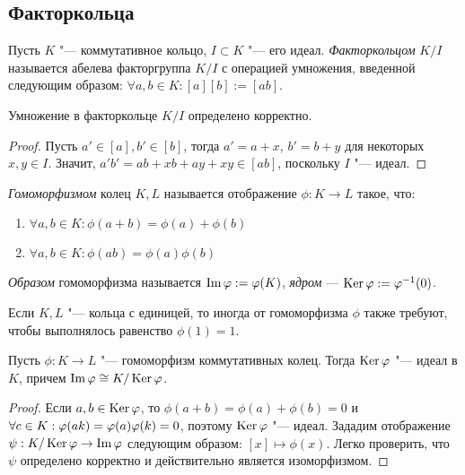 \subsection{Факторкольца}

\begin{definition}
	Пусть $K$ "--- коммутативное кольцо, $I \subset K$ "--- его идеал. \textit{Факторкольцом} $K / I$ называется абелева факторгруппа $K / I$ с операцией умножения, введенной следующим образом: $\forall a, b \in K: [a][b] := [ab]$.
\end{definition}

\begin{proposition}
	Умножение в факторкольце $K / I$ определено корректно.
\end{proposition}

\begin{proof}
	Пусть $a' \in [a], b' \in [b]$, тогда $a' = a + x$, $b' = b + y$ для некоторых $x, y \in I$. Значит, $a'b' = ab + xb + ay + xy \in [ab]$, поскольку $I$ "--- идеал.
\end{proof}

\begin{definition}
	\textit{Гомоморфизмом} колец $K, L$ называется отображение $\phi: K \to L$ такое, что:
	\begin{enumerate}
		\item $\forall a, b \in K: \phi(a + b) = \phi(a) + \phi(b)$
		\item $\forall a, b \in K: \phi(ab) = \phi(a)\phi(b)$
	\end{enumerate}

	\textit{Образом} гомоморфизма называется $\operatorname{Im}\varphi := \varphi(K)$, \textit{ядром} --- $\operatorname{Ker}\varphi := \varphi^{-1}(0)$.
\end{definition}

\begin{note}
	Если $K, L$ "--- кольца с единицей, то иногда от гомоморфизма $\phi$ также требуют, чтобы выполнялось равенство $\phi(1) = 1$.
\end{note}

\begin{theorem}
	Пусть $\phi : K \to L$ "--- гомоморфизм коммутативных колец. Тогда $\operatorname{Ker}\varphi$ "--- идеал в $K$, причем $\operatorname{Im}\varphi \cong K / \operatorname{Ker}{\varphi}$.
\end{theorem}

\begin{proof}
	Если $a, b \in \operatorname{Ker}\varphi$, то $\phi(a + b) = \phi(a) + \phi(b) = 0$ и $\forall c \in K: \phi(ak) \hm= \phi(a)\phi(k) = 0$, поэтому $\operatorname{Ker}\varphi$ "--- идеал. Зададим отображение $\psi: K/\operatorname{Ker}\varphi \to \operatorname{Im}\varphi$ следующим образом: $[x] \mapsto \phi(x)$. Легко проверить, что $\psi$ определено корректно и действительно является изоморфизмом.
\end{proof}

